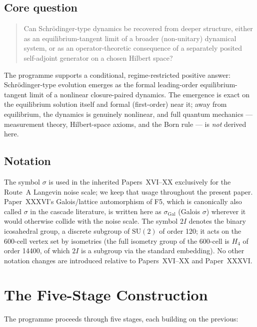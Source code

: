 \documentclass[12pt]{article}
\newcommand{\twoI}{2I}
\newcommand{\sigmaG}{\sigma_{\mathrm{Gal}}}
\begin{document}
\subsection*{Core question}

\begin{quote}
Can Schr\"odinger-type dynamics be recovered from deeper structure, either as an equilibrium-tangent limit of a broader (non-unitary) dynamical system, or as an operator-theoretic consequence of a separately posited self-adjoint generator on a chosen Hilbert space?
\end{quote}

The programme supports a conditional, regime-restricted positive answer: Schr\"odinger-type evolution emerges as the formal leading-order equilibrium-tangent limit of a nonlinear closure-paired dynamics. The emergence is exact on the equilibrium solution itself and formal (first-order) near it; away from equilibrium, the dynamics is genuinely nonlinear, and full quantum mechanics --- measurement theory, Hilbert-space axioms, and the Born rule --- is \emph{not} derived here.

\subsection*{Notation}

The symbol $\sigma$ is used in the inherited Papers~XVI--XX exclusively for the Route~A Langevin noise scale; we keep that usage throughout the present paper. Paper~XXXVI's Galois/lattice automorphism of F5, which is canonically also called $\sigma$ in the cascade literature, is written here as $\sigmaG$ (Galois $\sigma$) wherever it would otherwise collide with the noise scale. The symbol $\twoI$ denotes the binary icosahedral group, a discrete subgroup of $\mathrm{SU}(2)$ of order 120; it acts on the 600-cell vertex set by isometries (the full isometry group of the 600-cell is $H_4$ of order 14400, of which $\twoI$ is a subgroup via the standard embedding). No other notation changes are introduced relative to Papers~XVI--XX and Paper~XXXVI.

\section{The Five-Stage Construction}\label{sec:stages}

The programme proceeds through five stages, each building on the previous:
\end{document}
